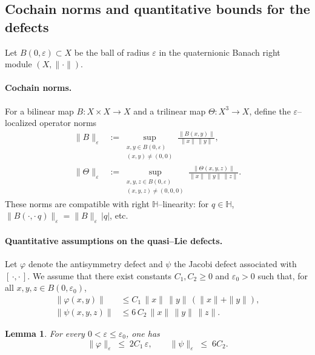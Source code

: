 \documentclass[10pt]{amsart}
\numberwithin{equation}{section}
\newtheorem{lem}[theorem]{Lemma}
\theoremstyle{remark}
\theoremstyle{definition}
\begin{document}
\subsection{Cochain norms and quantitative bounds for the defects}
Let $B(0,\varepsilon)\subset X$ be the ball of radius $\varepsilon$ in the quaternionic Banach right module $(X,\|\cdot\|)$.

\paragraph{Cochain norms.}
For a bilinear map $B:X\times X\to X$ and a trilinear map $\Theta:X^3\to X$, define the $\varepsilon$--localized operator norms
\begin{align}
\|B\|_\varepsilon &:= \sup_{\substack{x,y\in B(0,\varepsilon)\\ (x,y)\neq(0,0)}}
\frac{\|B(x,y)\|}{\|x\|\,\|y\|}, \label{eq:C2eps-norm}\\
\|\Theta\|_\varepsilon &:= \sup_{\substack{x,y,z\in B(0,\varepsilon)\\ (x,y,z)\neq(0,0,0)}}
\frac{\|\Theta(x,y,z)\|}{\|x\|\,\|y\|\,\|z\|}. \label{eq:C3eps-norm}
\end{align}
These norms are compatible with right $\mathbb H$--linearity: for $q\in\mathbb H$, $\|B(\cdot,\cdot\,q)\|_\varepsilon=\|B\|_\varepsilon\,|q|$, etc.

\paragraph{Quantitative assumptions on the quasi--Lie defects.}
Let $\varphi$ denote the antisymmetry defect and $\psi$ the Jacobi defect associated with $[\,\cdot,\cdot\,]$. We assume that there exist constants
$C_1,C_2\ge 0$ and $\varepsilon_0>0$ such that, for all $x,y,z\in B(0,\varepsilon_0)$,
\begin{align}
\|\varphi(x,y)\| &\le C_1\,\|x\|\,\|y\|\,(\|x\|+\|y\|), \label{eq:phi-pointwise}\\
\|\psi(x,y,z)\| &\le 6\,C_2\,\|x\|\,\|y\|\,\|z\|. \label{eq:psi-pointwise}
\end{align}

\begin{lem}\label{lem:localized-defects}
For every $0<\varepsilon\le \varepsilon_0$, one has
\begin{equation}\label{eq:phi_bound_local}
\|\varphi\|_\varepsilon \;\le\; 2 C_1\,\varepsilon,
\qquad
\|\psi\|_\varepsilon \;\le\; 6 C_2.
\end{equation}
\end{lem}
\end{document}
